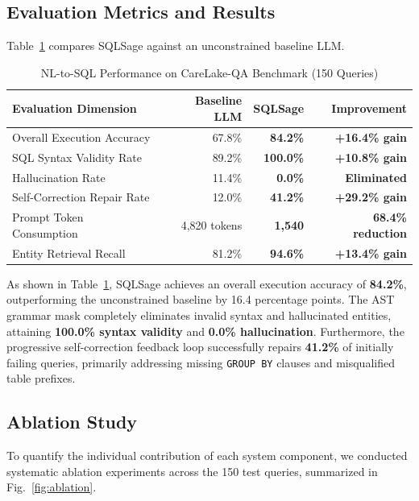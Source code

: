 \documentclass[10pt,journal,compsoc]{IEEEtran}
\begin{document}
\subsection{Evaluation Metrics and Results}
Table~\ref{tab:eval_results} compares SQLSage against an unconstrained baseline LLM.

\begin{table}[h]
\centering
\caption{NL-to-SQL Performance on CareLake-QA Benchmark (150 Queries)}
\label{tab:eval_results}
\begin{tabular}{lrrr}
\toprule
\textbf{Evaluation Dimension} & \textbf{Baseline LLM} & \textbf{SQLSage} & \textbf{Improvement} \\
\midrule
Overall Execution Accuracy    & 67.8\%                & \textbf{84.2\%}  & \textbf{+16.4\% gain} \\
SQL Syntax Validity Rate      & 89.2\%                & \textbf{100.0\%} & \textbf{+10.8\% gain} \\
Hallucination Rate            & 11.4\%                & \textbf{0.0\%}   & \textbf{Eliminated} \\
Self-Correction Repair Rate   & 12.0\%                & \textbf{41.2\%}  & \textbf{+29.2\% gain} \\
Prompt Token Consumption      & 4,820 tokens          & \textbf{1,540}   & \textbf{68.4\% reduction} \\
Entity Retrieval Recall       & 81.2\%                & \textbf{94.6\%}  & \textbf{+13.4\% gain} \\
\bottomrule
\end{tabular}
\end{table}

As shown in Table~\ref{tab:eval_results}, SQLSage achieves an overall execution accuracy of \textbf{84.2\%}, outperforming the unconstrained baseline by 16.4 percentage points. The AST grammar mask completely eliminates invalid syntax and hallucinated entities, attaining \textbf{100.0\% syntax validity} and \textbf{0.0\% hallucination}. Furthermore, the progressive self-correction feedback loop successfully repairs \textbf{41.2\%} of initially failing queries, primarily addressing missing \texttt{GROUP BY} clauses and misqualified table prefixes.

\subsection{Ablation Study}
To quantify the individual contribution of each system component, we conducted systematic ablation experiments across the 150 test queries, summarized in Fig.~\ref{fig:ablation}.
\end{document}
